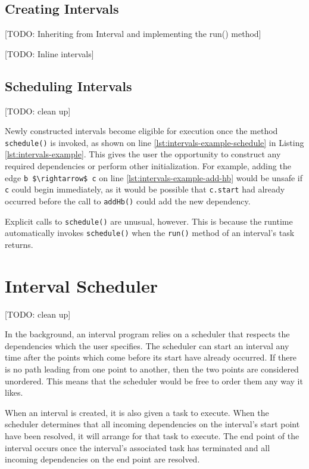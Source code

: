 \subsection{Creating Intervals}
\label{sec:intervals-creating-intervals}

[TODO: Inheriting from Interval and implementing the run() method]

[TODO: Inline intervals]

\subsection{Scheduling Intervals}
\label{sec:intervals-scheduling-intervals}

[TODO: clean up]

Newly constructed intervals become eligible for execution once the
method \lstinline|schedule()| is invoked, as shown on line
\ref{lst:intervals-example-schedule} in Listing
\ref{lst:intervals-example}. This gives the user the opportunity to
construct any required dependencies or perform other
initialization. For example, adding the edge 
\lstinline|b $\rightarrow$ c| on line
\ref{lst:intervals-example-add-hb} would be unsafe if \lstinline|c|
could begin immediately, as it would be possible that
\lstinline|c.start| had already occurred before the call to
\lstinline|addHb()| could add the new dependency.

Explicit calls to \lstinline|schedule()| are unusual, however. This is
because the runtime automatically invokes \lstinline|schedule()| when
the \lstinline|run()| method of an interval's task returns.

\section{Interval Scheduler}
\label{sec:intervals-interval-scheduler}

[TODO: clean up]

In the background, an interval program relies on a scheduler that
respects the dependencies which the user specifies. The scheduler can
start an interval any time after the points which come before its
start have already occurred. If there is no path leading from one
point to another, then the two points are considered unordered. This
means that the scheduler would be free to order them any way it likes.

When an interval is created, it is also given a task to execute. When
the scheduler determines that all incoming dependencies on the
interval's start point have been resolved, it will arrange for that
task to execute. The end point of the interval occurs once the
interval's associated task has terminated and all incoming
dependencies on the end point are resolved.

